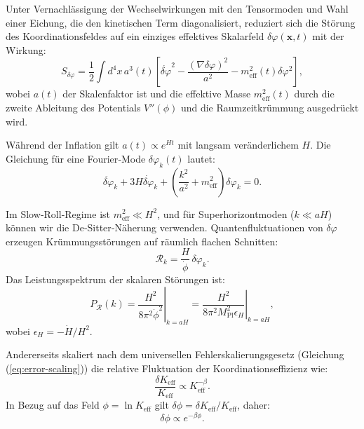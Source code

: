 \documentclass[11pt,a4paper]{article}
\newcommand{\Keff}{K_{\mathrm{eff}}}
\newcommand{\Mpl}{M_{\mathrm{Pl}}}
\begin{document}
	Unter Vernachlässigung der Wechselwirkungen mit den Tensormoden und Wahl einer Eichung, die den kinetischen Term diagonalisiert, reduziert sich die Störung des Koordinationsfeldes auf ein einziges effektives Skalarfeld \(\delta\varphi(\mathbf{x},t)\) mit der Wirkung:
	\begin{equation}
		S_{\delta\varphi} = \frac{1}{2} \int d^4x \, a^3(t) \left[ \dot{\delta\varphi}^2 - \frac{(\nabla\delta\varphi)^2}{a^2} - m_{\mathrm{eff}}^2(t) \delta\varphi^2 \right],
	\end{equation}
	wobei \(a(t)\) der Skalenfaktor ist und die effektive Masse \(m_{\mathrm{eff}}^2(t)\) durch die zweite Ableitung des Potentials \(V''(\phi)\) und die Raumzeitkrümmung ausgedrückt wird.
	
	Während der Inflation gilt \(a(t) \propto e^{Ht}\) mit langsam veränderlichem \(H\). Die Gleichung für eine Fourier‑Mode \(\delta\varphi_k(t)\) lautet:
	\begin{equation}
		\ddot{\delta\varphi}_k + 3H\dot{\delta\varphi}_k + \left( \frac{k^2}{a^2} + m_{\mathrm{eff}}^2 \right) \delta\varphi_k = 0.
	\end{equation}
	
	Im Slow‑Roll‑Regime ist \(m_{\mathrm{eff}}^2 \ll H^2\), und für Superhorizontmoden (\(k \ll aH\)) können wir die De‑Sitter‑Näherung verwenden. Quantenfluktuationen von \(\delta\varphi\) erzeugen Krümmungsstörungen auf räumlich flachen Schnitten:
	\begin{equation}
		\mathcal{R}_k = \frac{H}{\dot{\phi}} \, \delta\varphi_k.
	\end{equation}
	Das Leistungsspektrum der skalaren Störungen ist:
	\begin{equation}
		P_{\mathcal{R}}(k) = \left. \frac{H^2}{8\pi^2 \dot{\phi}^2} \right|_{k=aH} = \left. \frac{H^2}{8\pi^2 \Mpl^2 \epsilon_H} \right|_{k=aH},
	\end{equation}
	wobei \(\epsilon_H = -\dot{H}/H^2\).
	
	Andererseits skaliert nach dem universellen Fehlerskalierungsgesetz (Gleichung (\ref{eq:error-scaling})) die relative Fluktuation der Koordinationseffizienz wie:
	\begin{equation}
		\frac{\delta\Keff}{\Keff} \propto \Keff^{-\beta}.
	\end{equation}
	In Bezug auf das Feld \(\phi = \ln\Keff\) gilt \(\delta\phi = \delta\Keff/\Keff\), daher:
	\begin{equation}
		\delta\phi \propto e^{-\beta\phi}.
	\end{equation}
	
\end{document}
